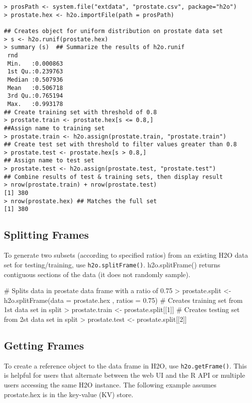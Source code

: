 \begin{lstlisting}[style=R]
> prosPath <- system.file("extdata", "prostate.csv", package="h2o")
> prostate.hex <- h2o.importFile(path = prosPath)

## Creates object for uniform distribution on prostate data set
> s <- h2o.runif(prostate.hex)
> summary (s)  ## Summarize the results of h2o.runif
 rnd               
 Min.   :0.000863  
 1st Qu.:0.239763  
 Median :0.507936  
 Mean   :0.506718  
 3rd Qu.:0.765194  
 Max.   :0.993178  
## Create training set with threshold of 0.8
> prostate.train <- prostate.hex[s <= 0.8,]
##Assign name to training set
> prostate.train <- h2o.assign(prostate.train, "prostate.train")
## Create test set with threshold to filter values greater than 0.8
> prostate.test <- prostate.hex[s > 0.8,]
## Assign name to test set
> prostate.test <- h2o.assign(prostate.test, "prostate.test")
## Combine results of test & training sets, then display result
> nrow(prostate.train) + nrow(prostate.test)
[1] 380
> nrow(prostate.hex) ## Matches the full set
[1] 380
\end{lstlisting}
 

\subsection{Splitting Frames}

To generate two subsets (according to specified ratios) from an existing H2O data set for testing/training, use {\texttt{h2o.splitFrame()}}.  h2o.splitFrame() returns contiguous sections of the data (it does not randomly sample).

\begin{spverbatim}
# Splits data in prostate data frame with a ratio of 0.75
> prostate.split <- h2o.splitFrame(data = prostate.hex , ratios = 0.75)
# Creates training set from 1st data set in split
> prostate.train <- prostate.split[[1]]
# Creates testing set from 2st data set in split
> prostate.test <- prostate.split[[2]]
\end{spverbatim}


\subsection{Getting Frames}

To create a reference object to the data frame in H2O, use {\texttt{h2o.getFrame()}}. This is helpful for  users that alternate between the web UI and the R API or multiple users accessing the same H2O instance. The following example assumes prostate.hex is in the key-value (KV) store.

